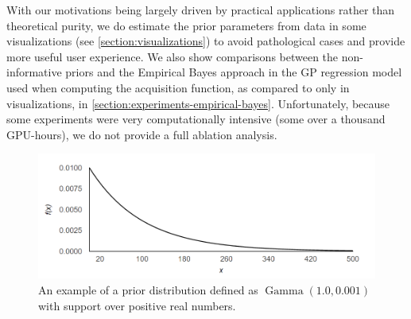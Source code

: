 With our motivations being largely driven by practical applications rather than theoretical purity, we do estimate the prior parameters from data in some visualizations (see \autoref{section:visualizations}) to avoid pathological cases and provide more useful user experience. We also show comparisons between the non-informative priors and the Empirical Bayes approach in the GP regression model used when computing the acquisition function, as compared to only in visualizations, in \autoref{section:experiments-empirical-bayes}. Unfortunately, because some experiments were very computationally intensive (some over a thousand GPU-hours), we do not provide a full ablation analysis.

\begin{figure}
	\begin{center}
		\includegraphics[width=1.0\textwidth]{images/gamma-prior.png}
		\caption{An example of a prior distribution defined as $\operatorname{Gamma}(1.0, 0.001)$ with support over positive real numbers.}
		\label{figure:gamma-prior}
	\end{center}
\end{figure}

